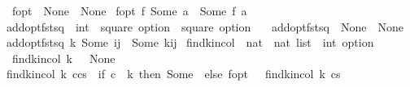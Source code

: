 \begin{isabellebody}
\ \ {\isachardoublequoteopen}f{\isacharunderscore}{\kern0pt}opt\ {\isacharunderscore}{\kern0pt}\ None\ {\isacharequal}{\kern0pt}\ None{\isachardoublequoteclose}\isanewline
{\isacharbar}{\kern0pt}\ {\isachardoublequoteopen}f{\isacharunderscore}{\kern0pt}opt\ f\ {\isacharparenleft}{\kern0pt}Some\ a{\isacharparenright}{\kern0pt}\ {\isacharequal}{\kern0pt}\ Some\ {\isacharparenleft}{\kern0pt}f\ a{\isacharparenright}{\kern0pt}{\isachardoublequoteclose}\isanewline
\isanewline
{}\isamarkupfalse%
\ add{\isacharunderscore}{\kern0pt}opt{\isacharunderscore}{\kern0pt}fst{\isacharunderscore}{\kern0pt}sq\ {\isacharcolon}{\kern0pt}{\isacharcolon}{\kern0pt}\ {\isachardoublequoteopen}int\ {\isasymRightarrow}\ square\ option\ {\isasymRightarrow}\ square\ option{\isachardoublequoteclose}\ \isanewline
\ \ {\isachardoublequoteopen}add{\isacharunderscore}{\kern0pt}opt{\isacharunderscore}{\kern0pt}fst{\isacharunderscore}{\kern0pt}sq\ {\isacharunderscore}{\kern0pt}\ None\ {\isacharequal}{\kern0pt}\ None{\isachardoublequoteclose}\isanewline
{\isacharbar}{\kern0pt}\ {\isachardoublequoteopen}add{\isacharunderscore}{\kern0pt}opt{\isacharunderscore}{\kern0pt}fst{\isacharunderscore}{\kern0pt}sq\ k\ {\isacharparenleft}{\kern0pt}Some\ {\isacharparenleft}{\kern0pt}i{\isacharcomma}{\kern0pt}j{\isacharparenright}{\kern0pt}{\isacharparenright}{\kern0pt}\ {\isacharequal}{\kern0pt}\ Some\ {\isacharparenleft}{\kern0pt}k{\isacharplus}{\kern0pt}i{\isacharcomma}{\kern0pt}j{\isacharparenright}{\kern0pt}{\isachardoublequoteclose}\isanewline
\isanewline
{}\isamarkupfalse%
\ find{\isacharunderscore}{\kern0pt}k{\isacharunderscore}{\kern0pt}in{\isacharunderscore}{\kern0pt}col\ {\isacharcolon}{\kern0pt}{\isacharcolon}{\kern0pt}\ {\isachardoublequoteopen}nat\ {\isasymRightarrow}\ nat\ list\ {\isasymRightarrow}\ int\ option{\isachardoublequoteclose}\ \isanewline
\ \ {\isachardoublequoteopen}find{\isacharunderscore}{\kern0pt}k{\isacharunderscore}{\kern0pt}in{\isacharunderscore}{\kern0pt}col\ k\ {\isacharbrackleft}{\kern0pt}{\isacharbrackright}{\kern0pt}\ {\isacharequal}{\kern0pt}\ None{\isachardoublequoteclose}\isanewline
{\isacharbar}{\kern0pt}\ {\isachardoublequoteopen}find{\isacharunderscore}{\kern0pt}k{\isacharunderscore}{\kern0pt}in{\isacharunderscore}{\kern0pt}col\ k\ {\isacharparenleft}{\kern0pt}c{\isacharhash}{\kern0pt}cs{\isacharparenright}{\kern0pt}\ {\isacharequal}{\kern0pt}\ {\isacharparenleft}{\kern0pt}if\ c\ {\isacharequal}{\kern0pt}\ k\ then\ Some\ {}\ else\ f{\isacharunderscore}{\kern0pt}opt\ {\isacharparenleft}{\kern0pt}{\isacharparenleft}{\kern0pt}{\isacharplus}{\kern0pt}{\isacharparenright}{\kern0pt}\ {}{\isacharparenright}{\kern0pt}\ {\isacharparenleft}{\kern0pt}find{\isacharunderscore}{\kern0pt}k{\isacharunderscore}{\kern0pt}in{\isacharunderscore}{\kern0pt}col\ k\ cs{\isacharparenright}{\kern0pt}{\isacharparenright}{\kern0pt}{\isachardoublequoteclose}\isanewline

\end{isabellebody}
